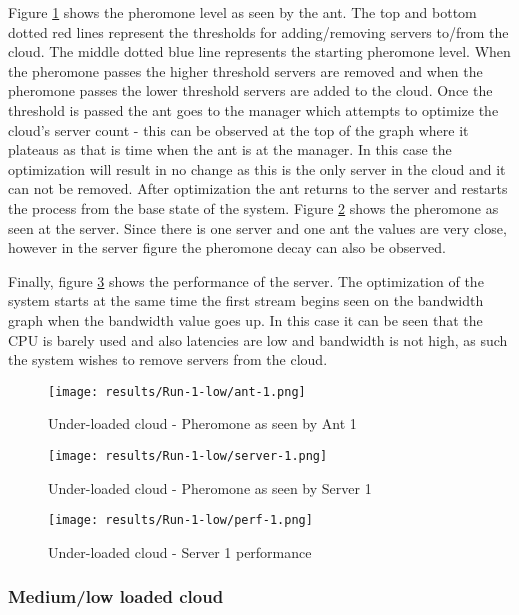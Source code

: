 Figure \ref{fig:1serv-ant} shows the pheromone level as seen by the ant. The top and bottom dotted red lines represent the thresholds for adding/removing servers to/from the cloud. The middle dotted blue line represents the starting pheromone level. When the pheromone passes the higher threshold servers are removed and when the pheromone passes the lower threshold servers are added to the cloud. Once the threshold is passed the ant goes to the manager which attempts to optimize the cloud's server count - this can be observed at the top of the graph where it plateaus as that is time when the ant is at the manager. In this case the optimization will result in no change as this is the only server in the cloud and it can not be removed. After optimization the ant returns to the server and restarts the process from the base state of the system. Figure \ref{fig:1serv-pher} shows the pheromone as seen at the server. Since there is one server and one ant the values are very close, however in the server figure the pheromone decay can also be observed. 

Finally, figure \ref{fig:1serv-perf} shows the performance of the server. The optimization of the system starts at the same time the first stream begins seen on the bandwidth graph when the bandwidth value goes up. In this case it can be seen that the CPU is barely used and also latencies are low and bandwidth is not high, as such the system wishes to remove servers from the cloud.

\begin{figure}
	\centering
		\texttt{[image: results/Run-1-low/ant-1.png]}
	\caption{Under-loaded cloud - Pheromone as seen by Ant 1}
	\label{fig:1serv-ant}
\end{figure}

\begin{figure}
	\centering
		\texttt{[image: results/Run-1-low/server-1.png]}
	\caption{Under-loaded cloud - Pheromone as seen by Server 1}
	\label{fig:1serv-pher}
\end{figure}

\begin{figure}
	\centering
		\texttt{[image: results/Run-1-low/perf-1.png]}
	\caption{Under-loaded cloud - Server 1 performance}
	\label{fig:1serv-perf}
\end{figure}

\subsubsection{Medium/low loaded cloud}

